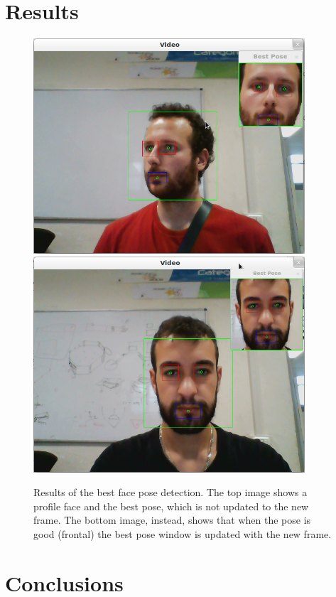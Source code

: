 \documentclass[10pt,a4paper]{report}
\begin{document}
\section*{Results}
\begin{figure}
\centering
\includegraphics[width=0.9\textwidth]{./best_face_jacopo.png}
\includegraphics[width=0.9\textwidth]{./best_face_rob.png}
\caption{Results of the best face pose detection. The top image shows a profile face and the best pose, which is not updated to the new frame. The bottom image, instead, shows that when the pose is good (frontal) the best pose window is updated with the new frame.}
\label{fig:best_pose}
\end{figure}
\section*{Conclusions}
\end{document}

